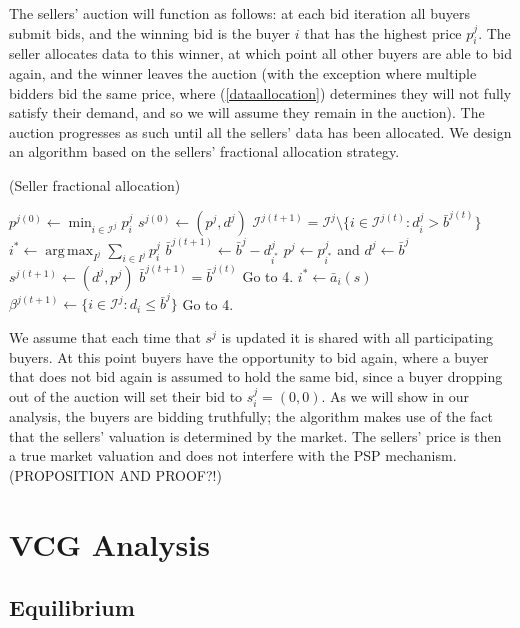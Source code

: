 \documentclass[12pt]{article}
\theoremstyle{definition}
\newcommand{\mcI}{\mathcal{I}}
\DeclareMathOperator*{\argmax}{arg\,max}
\begin{document}
\begin{multicols}{2}
The sellers' auction will function as follows: at each bid iteration all buyers
submit bids, and the winning bid is the buyer $i$ that has the highest price
$p_i^j$. The seller allocates
data to this winner, at which point all other buyers are able to bid again, and
the winner leaves the auction (with the exception where multiple bidders bid
the same price, where (\ref{dataallocation}) determines they will not fully
satisfy their demand, and so we will assume they remain in the auction). The auction progresses as such until all the
sellers' data has been allocated. We design an algorithm based on the sellers'
fractional allocation strategy.


\begin{algorithm}[H]
\caption{(Seller fractional allocation)}
\begin{algorithmic}[1]
\State $p^{j(0)} \gets \min_{i\in\mcI^j} p_i^j$
\State $s^{j(0)} \gets (p^j, d^j)$
\State $\mcI^{j(t+1)} = \mcI^j\setminus \lbrace i \in \mcI^{j(t)}: d_i^j >
\bar{b}^{j(t)}\rbrace$
\State $ i^* \gets \displaystyle\argmax_{I^j}\sum_{i\in I^j} p_i^j$ 
\State $\bar{b}^{j(t+1)} \gets \bar{b}^j - d_{i^*}^{j}$
\State $p^j \gets p_{i^*}^j$ and $d^j \gets \bar{b}^j$
\State $s^{j(t+1)} \gets (d^j, p^j)$
\State $\bar{b}^{j(t+1)} = \bar{b}^{j(t)}$
\State Go to 4.
\Else
\State $i^* \gets \bar a_i(s)$
\State $\beta^{j(t+1)} \gets \bigg\lbrace i\in\mcI^j: 
        d_i \le \bar{b}^j \bigg\rbrace$
\State Go to 4.
\EndIf
\EndWhile
\end{algorithmic}
\end{algorithm}
We assume that each time that $s^j$ is updated it is shared with all
participating buyers. At this point buyers have the opportunity to bid again,
where a buyer that does not bid again is assumed to hold the same bid, since a
buyer dropping out of the auction will set their bid to $s_i^j=(0,0)$. As we will show in our analysis, the buyers are bidding truthfully; the
algorithm makes use of the fact that the sellers' valuation is determined by the market.
The sellers' price is then a true market valuation and does not interfere with
the PSP mechanism. (PROPOSITION AND PROOF?!)

\section{VCG Analysis}
\subsection{Equilibrium}


\end{multicols}
\end{document}
